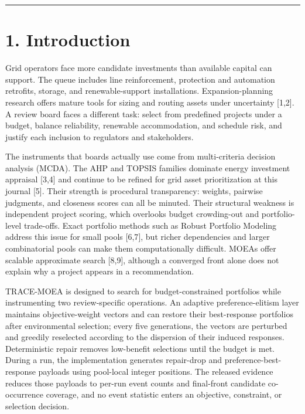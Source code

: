 \documentclass[
  10pt,
  a4paper,
]{article}
\begin{document}
\begin{center}\rule{0.5\linewidth}{0.5pt}\end{center}

\section{1. Introduction}\label{introduction}

Grid operators face more candidate investments than available capital
can support. The queue includes line reinforcement, protection and
automation retrofits, storage, and renewable-support installations.
Expansion-planning research offers mature tools for sizing and routing
assets under uncertainty {[}1,2{]}. A review board faces a different
task: select from predefined projects under a budget, balance
reliability, renewable accommodation, and schedule risk, and justify
each inclusion to regulators and stakeholders.

The instruments that boards actually use come from multi-criteria
decision analysis (MCDA). The AHP and TOPSIS families dominate energy
investment appraisal {[}3,4{]} and continue to be refined for grid asset
prioritization at this journal {[}5{]}. Their strength is procedural
transparency: weights, pairwise judgments, and closeness scores can all
be minuted. Their structural weakness is independent project scoring,
which overlooks budget crowding-out and portfolio-level trade-offs.
Exact portfolio methods such as Robust Portfolio Modeling address this
issue for small pools {[}6,7{]}, but richer dependencies and larger
combinatorial pools can make them computationally difficult. MOEAs offer
scalable approximate search {[}8,9{]}, although a converged front alone
does not explain why a project appears in a recommendation.

TRACE-MOEA is designed to search for budget-constrained portfolios while
instrumenting two review-specific operations. An adaptive
preference-elitism layer maintains objective-weight vectors and can
restore their best-response portfolios after environmental selection;
every five generations, the vectors are perturbed and greedily
reselected according to the dispersion of their induced responses.
Deterministic repair removes low-benefit selections until the budget is
met. During a run, the implementation generates repair-drop and
preference-best-response payloads using pool-local integer positions.
The released evidence reduces those payloads to per-run event counts and
final-front candidate co-occurrence coverage, and no event statistic
enters an objective, constraint, or selection decision.
\end{document}

